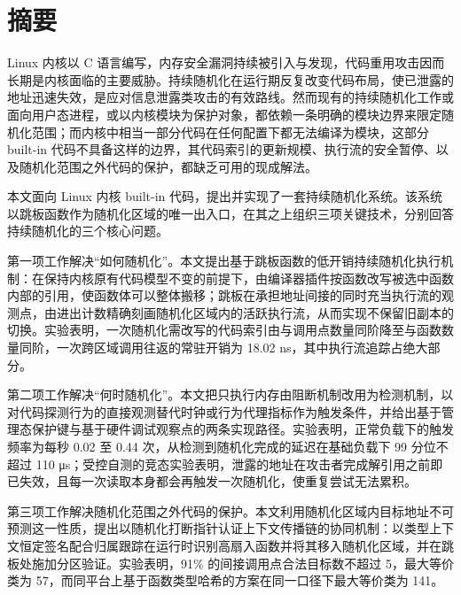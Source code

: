 \maketitle%
\MAKETITLE%
\makedeclaration%
\intobmk\chapter*{摘\quad 要}%
\setcounter{page}{1}%

Linux 内核以 C 语言编写，内存安全漏洞持续被引入与发现，代码重用攻击因而长期是内核面临的主要威胁。持续随机化在运行期反复改变代码布局，使已泄露的地址迅速失效，是应对信息泄露类攻击的有效路线。然而现有的持续随机化工作或面向用户态进程，或以内核模块为保护对象，都依赖一条明确的模块边界来限定随机化范围；而内核中相当一部分代码在任何配置下都无法编译为模块，这部分 built-in 代码不具备这样的边界，其代码索引的更新规模、执行流的安全暂停、以及随机化范围之外代码的保护，都缺乏可用的现成解法。

本文面向 Linux 内核 built-in 代码，提出并实现了一套持续随机化系统。该系统以跳板函数作为随机化区域的唯一出入口，在其之上组织三项关键技术，分别回答持续随机化的三个核心问题。

第一项工作解决“如何随机化”。本文提出基于跳板函数的低开销持续随机化执行机制：在保持内核原有代码模型不变的前提下，由编译器插件按函数改写被选中函数内部的引用，使函数体可以整体搬移；跳板在承担地址间接的同时充当执行流的观测点，由进出计数精确刻画随机化区域内的活跃执行流，从而实现不保留旧副本的切换。实验表明，一次随机化需改写的代码索引由与调用点数量同阶降至与函数数量同阶，一次跨区域调用往返的常驻开销为 18.02 ns，其中执行流追踪占绝大部分。

第二项工作解决“何时随机化”。本文把只执行内存由阻断机制改用为检测机制，以对代码探测行为的直接观测替代时钟或行为代理指标作为触发条件，并给出基于管理态保护键与基于硬件调试观察点的两条实现路径。实验表明，正常负载下的触发频率为每秒 0.02 至 0.44 次，从检测到随机化完成的延迟在基础负载下 99 分位不超过 110 μs；受控自测的竞态实验表明，泄露的地址在攻击者完成解引用之前即已失效，且每一次读取本身都会再触发一次随机化，使重复尝试无法累积。

第三项工作解决随机化范围之外代码的保护。本文利用随机化区域内目标地址不可预测这一性质，提出以随机化打断指针认证上下文传播链的协同机制：以类型上下文恒定签名配合归属跟踪在运行时识别高扇入函数并将其移入随机化区域，并在跳板处施加分区验证。实验表明，91\% 的间接调用点合法目标数不超过 5，最大等价类为 57，而同平台上基于函数类型哈希的方案在同一口径下最大等价类为 141。

